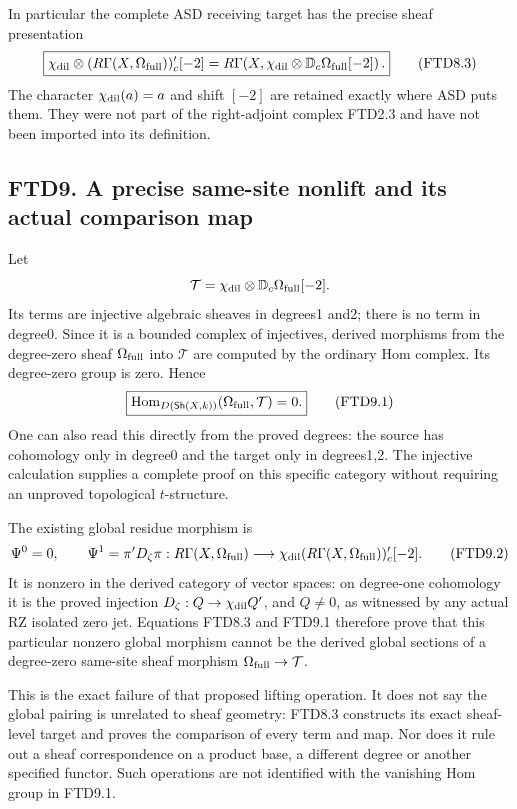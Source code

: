In particular the complete ASD receiving target has the precise sheaf
presentation \[
\boxed{
\chi_{\rm dil}\otimes
(R\Gamma(X,\Omega_{\rm full}))'_c[-2]
=
R\Gamma\!\left(X,\chi_{\rm dil}\otimes
\mathbb D_c\Omega_{\rm full}[-2]\right).}
\tag{FTD8.3}
\] The character \(\chi_{\rm dil}(a)=a\) and shift \([-2]\) are retained
exactly where ASD puts them. They were not part of the right-adjoint
complex FTD2.3 and have not been imported into its definition.

\subsection{FTD9. A precise same-site nonlift and its actual comparison
map}\label{ftd9.-a-precise-same-site-nonlift-and-its-actual-comparison-map}

Let \[
\mathcal T=\chi_{\rm dil}\otimes\mathbb D_c\Omega_{\rm full}[-2].
\] Its terms are injective algebraic sheaves in degrees1 and2; there is
no term in degree0. Since it is a bounded complex of injectives, derived
morphisms from the degree-zero sheaf \(\Omega_{\rm full}\) into
\(\mathcal T\) are computed by the ordinary Hom complex. Its degree-zero
group is zero. Hence \[
\boxed{
\operatorname{Hom}_{D(\mathsf{Sh}(X,k))}
(\Omega_{\rm full},\mathcal T)=0.}
\tag{FTD9.1}
\] One can also read this directly from the proved degrees: the source
has cohomology only in degree0 and the target only in degrees1,2. The
injective calculation supplies a complete proof on this specific
category without requiring an unproved topological \(t\)-structure.

The existing global residue morphism is \[
\Psi^0=0,\qquad
\Psi^1=\pi'D_\zeta\pi:
R\Gamma(X,\Omega_{\rm full})
\longrightarrow
\chi_{\rm dil}(R\Gamma(X,\Omega_{\rm full}))'_c[-2].
\tag{FTD9.2}
\] It is nonzero in the derived category of vector spaces: on degree-one
cohomology it is the proved injection \(D_\zeta:Q\to\chi_{\rm dil}Q'\),
and \(Q\ne0\), as witnessed by any actual RZ isolated zero jet.
Equations FTD8.3 and FTD9.1 therefore prove that this particular nonzero
global morphism cannot be the derived global sections of a degree-zero
same-site sheaf morphism \(\Omega_{\rm full}\to\mathcal T\).

This is the exact failure of that proposed lifting operation. It does
not say the global pairing is unrelated to sheaf geometry: FTD8.3
constructs its exact sheaf-level target and proves the comparison of
every term and map. Nor does it rule out a sheaf correspondence on a
product base, a different degree or another specified functor. Such
operations are not identified with the vanishing Hom group in FTD9.1.

